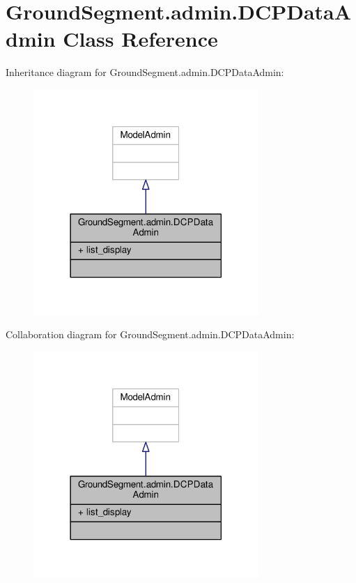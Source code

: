 \hypertarget{class_ground_segment_1_1admin_1_1_d_c_p_data_admin}{}\section{Ground\+Segment.\+admin.\+D\+C\+P\+Data\+Admin Class Reference}
\label{class_ground_segment_1_1admin_1_1_d_c_p_data_admin}


Inheritance diagram for Ground\+Segment.\+admin.\+D\+C\+P\+Data\+Admin\+:\nopagebreak
\begin{figure}[H]
\begin{center}
\leavevmode
\includegraphics[width=242pt]{class_ground_segment_1_1admin_1_1_d_c_p_data_admin__inherit__graph}
\end{center}
\end{figure}


Collaboration diagram for Ground\+Segment.\+admin.\+D\+C\+P\+Data\+Admin\+:\nopagebreak
\begin{figure}[H]
\begin{center}
\leavevmode
\includegraphics[width=242pt]{class_ground_segment_1_1admin_1_1_d_c_p_data_admin__coll__graph}
\end{center}
\end{figure}
